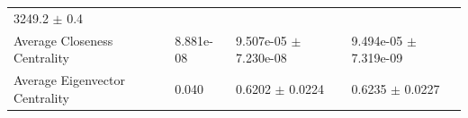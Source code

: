 \documentclass[12pt,twoside]{amherstthesis}
\begin{document}
\begin{longtable}[]{@{}llll@{}}
\begin{minipage}[t]{0.25\columnwidth}
  3249.2 \(\pm\) 0.4\strut
  \end{minipage}\tabularnewline
  \begin{minipage}[t]{0.29\columnwidth}\raggedright\strut
  Average Closeness Centrality\strut
  \end{minipage} & \begin{minipage}[t]{0.11\columnwidth}\raggedright\strut
  8.881e-08\strut
  \end{minipage} & \begin{minipage}[t]{0.25\columnwidth}\raggedright\strut
  9.507e-05 \(\pm\) 7.230e-08\strut
  \end{minipage} & \begin{minipage}[t]{0.25\columnwidth}\raggedright\strut
  9.494e-05 \(\pm\) 7.319e-09\strut
  \end{minipage}\tabularnewline
  \begin{minipage}[t]{0.29\columnwidth}\raggedright\strut
  Average Eigenvector Centrality\strut
  \end{minipage} & \begin{minipage}[t]{0.11\columnwidth}\raggedright\strut
  0.040\strut
  \end{minipage} & \begin{minipage}[t]{0.25\columnwidth}\raggedright\strut
  0.6202 \(\pm\) 0.0224\strut
  \end{minipage} & \begin{minipage}[t]{0.25\columnwidth}\raggedright\strut
  0.6235 \(\pm\) 0.0227\strut
  \end{minipage}\tabularnewline
  \bottomrule
  \end{longtable}
  
\end{document}
